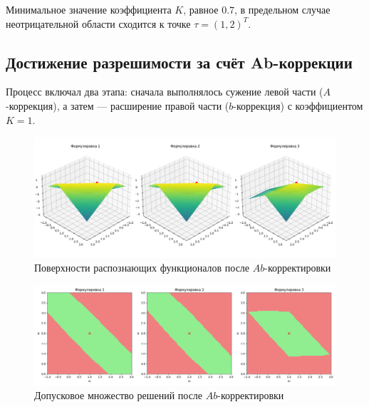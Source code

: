 \documentclass{article}
\begin{document}
Минимальное значение коэффициента \( K \), равное \( 0.7 \), в предельном случае неотрицательной области сходится к точке \( \tau = (1, 2)^T \).



\subsection{Достижение разрешимости за счёт Ab-коррекции}

Процесс включал два этапа: сначала выполнялось сужение левой части (\( A \)-коррекция), а затем — расширение правой части (\( b \)-коррекция) с коэффициентом \( K = 1 \).

\begin{figure}[H]
    \begin{center}
        \includegraphics[width = \textwidth]{tol_ab_corrected}
        \caption{Поверхности распознающих функционалов после
    \( Ab \)-корректировки}
  \label{figure:tol_ab_corrected}
    \end{center}
\end{figure}

\begin{figure}[H]
    \begin{center}
        \includegraphics[width = \textwidth]{tol_functional_ab_corrected}
        \caption{Допусковое множество решений после \( Ab \)-корректировки}
  \label{figure:tol_functional_ab_corrected}
    \end{center}
\end{figure}
\end{document}
